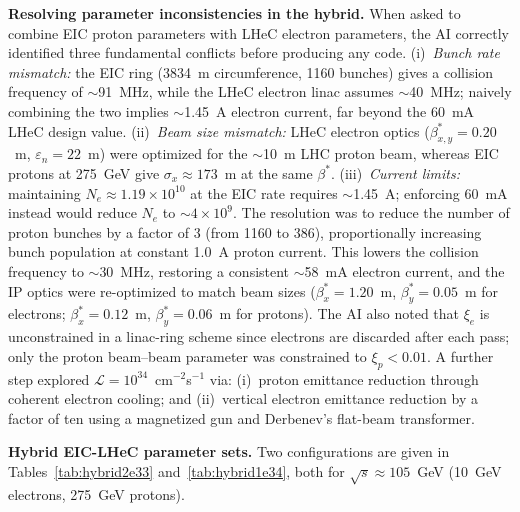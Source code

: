 \documentclass[%
               refpage       %
               hyphens,      %
               ]{jacow}
\begin{document}
\textbf{Resolving parameter inconsistencies in the hybrid.}
When asked to combine EIC proton parameters with LHeC electron parameters, 
the AI correctly identified three fundamental conflicts before producing any 
code. (i)~\textit{Bunch rate mismatch:} the EIC ring (3834~m circumference, 
1160 bunches) gives a collision frequency of $\sim$91~MHz, while the LHeC 
electron linac assumes $\sim$40~MHz; naively combining the two implies 
$\sim$1.45~A electron current, far beyond the 60~mA LHeC design value. 
(ii)~\textit{Beam size mismatch:} LHeC electron optics 
($\beta^*_{x,y}=0.20$~m, $\varepsilon_n=22$~\textmu m) were optimized for 
the $\sim$10~\textmu m LHC proton beam, whereas EIC protons at 275~GeV give 
$\sigma_x\approx173$~\textmu m at the same $\beta^*$. 
(iii)~\textit{Current limits:} maintaining $N_e\approx1.19\times10^{10}$ at 
the EIC rate requires $\sim$1.45~A; enforcing 60~mA instead would reduce 
$N_e$ to $\sim4\times10^9$. The resolution was to reduce the number of 
proton bunches by a factor of 3 (from 1160 to 386), proportionally 
increasing bunch population at constant 1.0~A proton current. This lowers 
the collision frequency to $\sim$30~MHz, restoring a consistent 
$\sim$58~mA electron current, and the IP optics were re-optimized to 
match beam sizes ($\beta^*_x=1.20$~m, $\beta^*_y=0.05$~m for electrons; 
$\beta^*_x=0.12$~m, $\beta^*_y=0.06$~m for protons). The AI also noted 
that $\xi_e$ is unconstrained in a linac-ring scheme since electrons are 
discarded after each pass; only the proton beam--beam parameter was 
constrained to $\xi_p < 0.01$. A further step explored 
$\mathcal{L}=10^{34}$~cm$^{-2}$s$^{-1}$ via: (i)~proton emittance 
reduction through coherent electron cooling; and (ii)~vertical electron 
emittance reduction by a factor of ten using a magnetized gun and 
Derbenev's flat-beam transformer\cite{derbenev}.

\textbf{Hybrid EIC-LHeC parameter sets.}
Two configurations are given in Tables~\ref{tab:hybrid2e33} 
and~\ref{tab:hybrid1e34}, both for $\sqrt{s}\approx105$~GeV 
(10~GeV electrons, 275~GeV protons).
\end{document}
